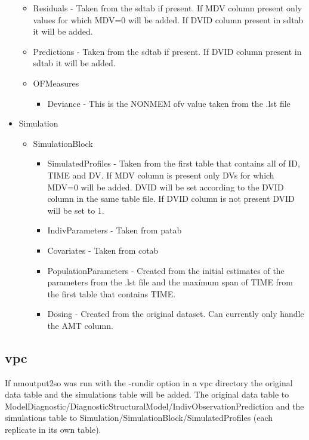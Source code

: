 \begin{itemize}
\begin{itemize}
\begin{itemize}
\begin{itemize}
                \end{itemize}
            \end{itemize}
            \item Residuals - Taken from the sdtab if present. If MDV column present only values for which MDV=0 will be added. If DVID column present in sdtab it will be added.
            \item Predictions - Taken from the sdtab if present. If DVID column present in sdtab it will be added.
            \item OFMeasures
                \begin{itemize}
                    \item Deviance - This is the NONMEM ofv value taken from the .lst file
                \end{itemize}
        \end{itemize}
    \item Simulation 
        \begin{itemize}
            \item SimulationBlock    
            \begin{itemize}
                \item SimulatedProfiles - Taken from the first table that contains all of ID, TIME and DV. If MDV column is present only DVs for which MDV=0 will be added. DVID will be set according to the DVID column in the same table file. If DVID column is not present DVID will be set to 1.
                \item IndivParameters - Taken from patab
                \item Covariates - Taken from cotab
                \item PopulationParameters - Created from the initial estimates of the parameters from the .lst file and the maxímum span of TIME from the first table that contains TIME.
                \item Dosing - Created from the original dataset. Can currently only handle the AMT column.
            \end{itemize}
        \end{itemize}
\end{itemize}

\subsection{vpc}
If nmoutput2so was run with the -rundir option in a vpc directory the original data table and the simulations table will be added.
The original data table to ModelDiagnostic/DiagnosticStructuralModel/IndivObservationPrediction and the simulations table to
Simulation/SimulationBlock/SimulatedProfiles (each replicate in its own table).


